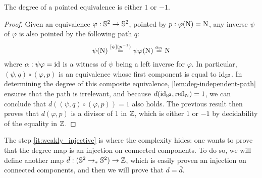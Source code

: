 \documentclass[english,a4paper]{lmcs}
\begin{document}
\begin{cor}
  The degree of a pointed equivalence is either $1$ or $-1$.
  \label{cor:degree-equivalences}
\end{cor}
\begin{proof}
  Given an equivalence $\varphi:{{\mathbb S^{2}}} \to {{\mathbb S^{2}}}$, pointed by $p:\varphi(\mathrm{N}) = \mathrm{N}$,
  any inverse $\psi$ of $\varphi$ is also pointed by the following path $q$:
  \begin{displaymath}
    \psi(\mathrm{N}) \overset {\mathop{\left[{\psi}\right]}(p^{-1})} = \psi\varphi(\mathrm{N}) \overset {\alpha_{\mathrm{N}}}  = \mathrm{N}
  \end{displaymath}
  where $\alpha: \psi\varphi = \mathord{\mathrm{id}}$ is a witness of $\psi$ being a left inverse
  for $\varphi$. In particular, $(\psi, q) \circ (\varphi, p)$ is an
  equivalence whose first component is equal to $\mathord{\mathrm{id}}_{{\mathbb S^{2}}}$. In determining the
  degree of this composite equivalence, \cref{lem:deg-independent-path} ensures
  that the path is irrelevant, and because $d(\mathord{\mathrm{id}}_{{\mathbb S^{2}}}, \mathop{{\mathrm{refl}}_{\mathrm{N}}}) = 1$, we can
  conclude that $d((\psi, q) \circ (\varphi, p)) = 1$ also holds. The previous
  result then proves that $d(\varphi, p)$ is a divisor of $1$ in $\mathbb{Z}$, which
  is either $1$ or $-1$ by decidability of the equality in $\mathbb{Z}$.
\end{proof}

The step \ref{it:weakly_injective}
is where the complexity hides: one wants to prove that the degree
map is an injection on connected components. To do so, we will define
another map $\bar d: ({{\mathbb S^{2}}} \to_\ast {{\mathbb S^{2}}}) \to \mathbb{Z}$, which is easily proven an
injection on connected components, and then we will prove that $d = \bar d$.
\end{document}
